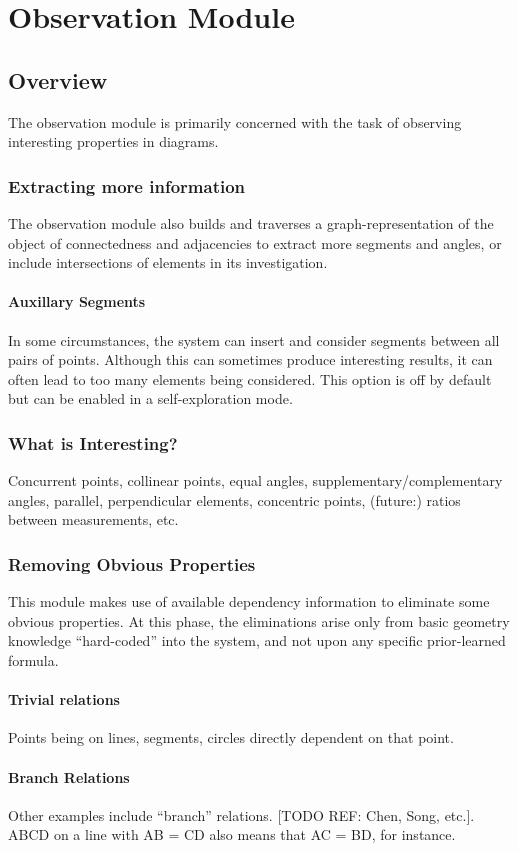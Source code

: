 \chapter{Observation Module}
\label{chap:observer}

\section{Overview}

The observation module is primarily concerned with the task of
observing interesting properties in diagrams.

\subsection{Extracting more information}

The observation module also builds and traverses a
graph-representation of the object of connectedness and adjacencies to
extract more segments and angles, or include intersections of elements
in its investigation.

\subsubsection{Auxillary Segments}

In some circumstances, the system can insert and consider segments
between all pairs of points. Although this can sometimes produce
interesting results, it can often lead to too many elements being
considered. This option is off by default but can be enabled in a
self-exploration mode.

\subsection{What is Interesting?}

Concurrent points, collinear points, equal angles,
supplementary/complementary angles, parallel, perpendicular elements,
concentric points, (future:) ratios between measurements, etc.

\subsection{Removing Obvious Properties}

This module makes use of available dependency information to eliminate
some obvious properties. At this phase, the eliminations arise only
from basic geometry knowledge ``hard-coded'' into the system, and not
upon any specific prior-learned formula.

\subsubsection{Trivial relations}

Points being on lines, segments, circles directly dependent on that point.

\subsubsection{Branch Relations}

Other examples include ``branch'' relations. [TODO REF: Chen, Song,
  etc.]. ABCD on a line with AB = CD also means that AC = BD, for instance.
